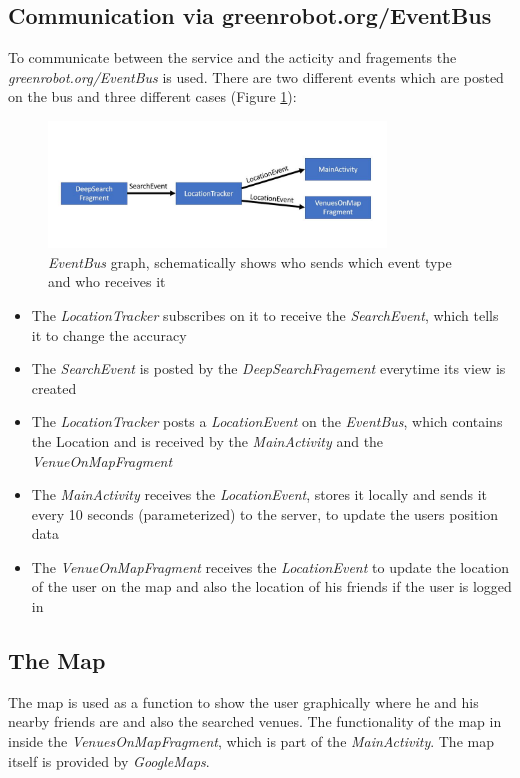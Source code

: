 \subsection{Communication via greenrobot.org/EventBus}
To communicate between the service and the acticity and fragements the \textit{greenrobot.org/EventBus} is used. There are two different events which are posted on the bus and three different cases  (Figure \ref{fig:eventbus}):
\begin{figure}[htbp]
	\includegraphics[width=0.8\textwidth]{images/eventBus.jpg}
	\centering
	\caption{\textit{EventBus} graph, schematically shows who sends which event type and who receives it}\label{fig:eventbus}
\end{figure} 
\begin{itemize}
\item The \textit{LocationTracker} subscribes on it to receive the \textit{SearchEvent}, which tells it to change the accuracy
\item The \textit{SearchEvent} is posted by the \textit{DeepSearchFragement} everytime its view is created
\item The \textit{LocationTracker} posts a \textit{LocationEvent} on the \textit{EventBus}, which contains the Location and is received by the \textit{MainActivity} and the \textit{VenueOnMapFragment}
\item The \textit{MainActivity} receives the \textit{LocationEvent}, stores it locally and sends it every 10 seconds (parameterized) to the server, to update the users position data
\item The \textit{VenueOnMapFragment} receives the \textit{LocationEvent} to update the location of the user on the map and also the location of his friends if the user is logged in
\end{itemize}

\subsection{The Map} \label{markervenue}
The map is used as a function to show the user graphically where he and his nearby friends are and also the searched venues. The functionality of the map in inside the \textit{VenuesOnMapFragment}, which is part of the \textit{MainActivity}. The map itself is provided by \textit{GoogleMaps}.

